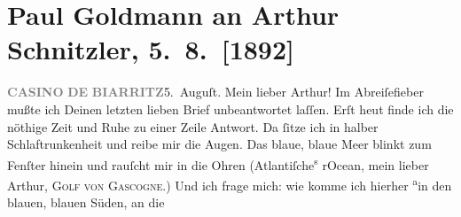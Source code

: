 

         
         \renewcommand{\erwaehntePersonen}{Personen: Richard Beer-Hofmann, Fedor Mamroth}
         \renewcommand{\erwaehnteInstitutionen}{Institutionen: Casino de Biarritz}
         \renewcommand{\erwaehnteOrte}{Orte: Atlantischer Ozean, Biarritz, Biskaya, Café Pfob, Cauterets, Faberhäuser, Frankreich, Pau, Pyrenees, Salzburg, San Sebastian, Spanien, Wien}
         \renewcommand{\erwaehnteWerke}{Werke: Aus der Kaffeehausecke, Gespräch, welches in der Kaffeehausecke nach Vorlesung der »Elixiere« geführt wird, Tagebuch}
               \section[Paul Goldmann an Arthur Schnitzler, 5. 8. {[}1892{]}]{ Paul Goldmann an Arthur Schnitzler, 5. 8. {[}1892{]}}\nopagebreak{}\rehead{ }\begin{ledgroupsized}[t]{13cm}\normalsize\beginnumbering \toendnotes[C]{\smallbreak\pagebreak[2]} 
\toendnotes[C]{\smallbreak}\pstart
           \noindent{}{\pb}\textcolor{gray}{\textbf{CASINO}}\pend
           \pstart
           \textcolor{gray}{\textbf{DE}}\pend
           \pstart
           \textcolor{gray}{\textbf{BIARRITZ}}\hfill 5. Auguſt. \pend
           \pstart\center{}Mein lieber Arthur!\pend\pstart
           Im Abreiſefieber mußte ich Deinen letzten lieben Brief unbeantwortet laſſen. Erſt
                  heut finde ich die nöthige Zeit und Ruhe zu einer
               Zeile Antwort. Da ſitze ich in halber Schlaftrunkenheit und reibe mir die Augen. Das
               blaue, blaue Meer blinkt zum Fenſter hinein und rauſcht mir in die Ohren (Atlantiſche\substVorne{}\textsuperscript{s }\substDazwischen{}r\substHinten{}{ }{\pb}Ocean, mein lieber Arthur, \textsc{Golf von Gascogne}.) Und ich frage mich: wie  komme ich hierher \substVorne{}\textsuperscript{a}\substDazwischen{}in\substHinten{} den blauen, blauen Süden,  an die

\end{ledgroupsized}
